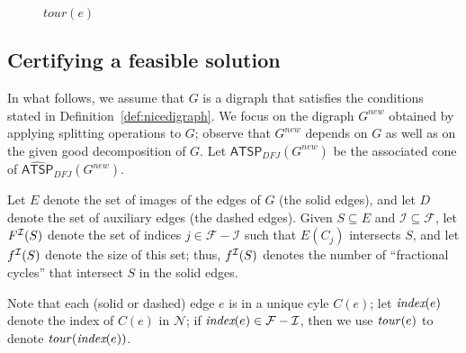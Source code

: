 \documentclass[11pt]{article}
\newcommand{\atspdfj}{\homog{\textsf{ATSP$_{\mathit{DFJ}}$}}}
\newcommand{\atspdfjpolytope}{\widehat{\textsf{ATSP}}_{\mathit{DFJ}}}
\newcommand{\cindset}{\mathcal{N}}
\newcommand{\fracset}{\mathcal{F}}
\newcommand{\sgn}{\mathcal{I}}
\newcommand{\homog}[1]{{#1}}
\begin{document}
{\begin{figure}[htb]
\centering
{}
\caption{$tour(e)$}
\label{fig-tour}
\end{figure}
}

\subsection{Certifying a feasible solution}

In what follows, we assume that $G$ is a digraph
that satisfies the conditions stated in
Definition~\ref{def:nicedigraph}.
We focus on the digraph
$G^{new}$ obtained by applying splitting operations to $G$;
observe that $G^{new}$ depends on $G$ as well as on
the given good decomposition of $G$. Let $\atspdfj(G^{new})$ be the associated cone of $\atspdfjpolytope(G^{new})$.

Let $E$ denote the set of images of the edges of $G$ (the solid edges),
and let $D$ denote the set of auxiliary edges (the dashed edges).
Given $S\subseteq E$ and $\sgn \subseteq \fracset$,
let $\goodfrac{\sgn}{S}$ denote the
set of indices $j\in \fracset - \sgn$ such that
$E(C_j)$ intersects $S$,
and let $\szgoodfrac{\sgn}{S}$ denote the size of this set;
thus, $\szgoodfrac{\sgn}{S}$ denotes the number of ``fractional cycles''
that intersect $S$ in the solid edges.

Note that each (solid or dashed) edge $e$ is in a unique cyle $C(e)$;
let $\textit{index}(e)$ denote the index of $C(e)$ in $\cindset$;
if $\cindex{e}\in\fracset-\sgn$, then we use $\textit{tour\/}(e)$ to
denote $\textit{tour\/}(\textit{index}(e))$.
\end{document}
